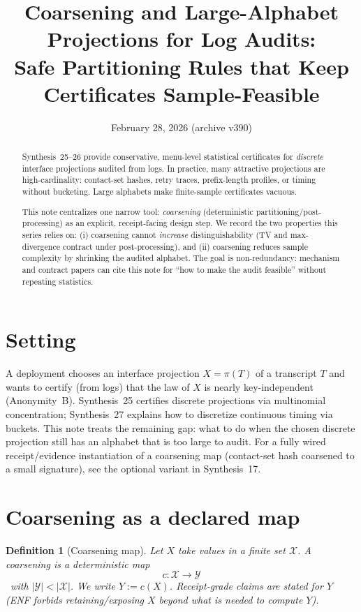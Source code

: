 \documentclass[11pt]{article}
\title{Coarsening and Large-Alphabet Projections for Log Audits:\\
\large Safe Partitioning Rules that Keep Certificates Sample-Feasible}
\author{}
\date{February 28, 2026 (archive v390)}
\newtheorem{definition}{Definition}
\begin{document}
\maketitle

\begin{abstract}
Synthesis~25--26 provide conservative, menu-level statistical certificates for \emph{discrete} interface projections audited from logs.
In practice, many attractive projections are high-cardinality: contact-set hashes, retry traces, prefix-length profiles, or timing without bucketing.
Large alphabets make finite-sample certificates vacuous.

This note centralizes one narrow tool: \emph{coarsening} (deterministic partitioning/post-processing) as an explicit, receipt-facing design step.
We record the two properties this series relies on: (i) coarsening cannot \emph{increase} distinguishability (TV and max-divergence contract under post-processing), and (ii) coarsening reduces sample complexity by shrinking the audited alphabet.
The goal is non-redundancy: mechanism and contract papers can cite this note for ``how to make the audit feasible'' without repeating statistics.
\end{abstract}

\section{Setting}
A deployment chooses an interface projection $X=\pi(T)$ of a transcript $T$ and wants to certify (from logs) that the law of $X$ is nearly key-independent (Anonymity~B).\cite{series:profiling}
Synthesis~25 certifies discrete projections via multinomial concentration; Synthesis~27 explains how to discretize continuous timing via buckets.\cite{series:stataudit,series:bucketdesign}
This note treats the remaining gap: what to do when the chosen discrete projection still has an alphabet that is too large to audit.
For a fully wired receipt/evidence instantiation of a coarsening map (contact-set hash coarsened to a small signature), see the optional variant in Synthesis~17.\cite{series:workedexample}


\section{Coarsening as a declared map}
\begin{definition}[Coarsening map]
Let $X$ take values in a finite set $\mathcal X$.
A \emph{coarsening} is a deterministic map
\[c:\mathcal X\to\mathcal Y\]\
with $|\mathcal Y|<|\mathcal X|$.
We write $Y:=c(X)$.
Receipt-grade claims are stated for $Y$ (ENF forbids retaining/exposing $X$ beyond what is needed to compute $Y$).\cite{series:traceifaces}
\end{definition}
\end{document}
